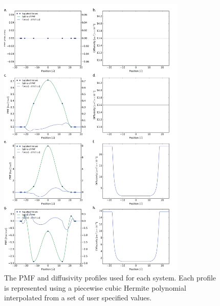     \begin{figure}[!htbp]
    \begin{center}
        \includegraphics[width=0.8\textwidth]{Figures/profiles.png}
        \caption[PMF and diffusivity profiles assigned for toy systems]{The PMF and diffusivity profiles used for each system. Each profile is represented using a piecewise cubic Hermite polynomial interpolated from a set of user specified values.}
        \label{fig:profiles}
    \end{center}
    \end{figure}

